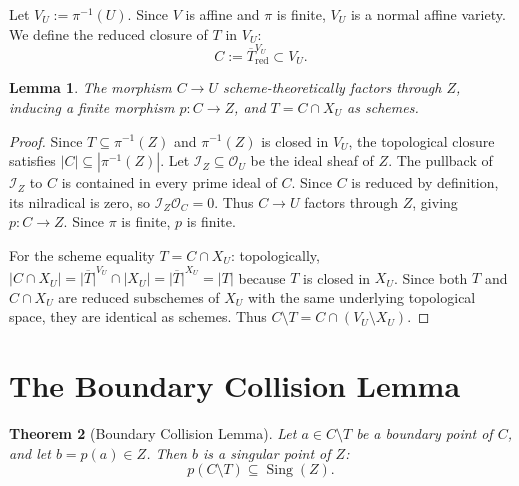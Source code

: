 \documentclass[11pt,reqno]{amsart}
\theoremstyle{plain}
\newtheorem{theorem}{Theorem}[section]
\newtheorem{lemma}[theorem]{Lemma}
\theoremstyle{definition}
\numberwithin{equation}{section}
\DeclareMathOperator{\Sing}{Sing}
\newcommand{\cO}{\mathcal{O}}
\begin{document}
Let $V_U := \pi^{-1}(U)$. Since $V$ is affine and $\pi$ is finite, $V_U$ is a normal affine variety.
We define the reduced closure of $T$ in $V_U$:
\begin{equation}\label{eq:closure-C}
C := \overline{T}^{V_U}_{\mathrm{red}} \subset V_U.
\end{equation}

\begin{lemma}\label{lem:closure-factorization}
The morphism $C \to U$ scheme-theoretically factors through $Z$, inducing a finite morphism $p: C \to Z$, and $T = C \cap X_U$ as schemes.
\end{lemma}
\begin{proof}
Since $T \subseteq \pi^{-1}(Z)$ and $\pi^{-1}(Z)$ is closed in $V_U$, the topological closure satisfies $|C| \subseteq |\pi^{-1}(Z)|$.
Let $\mathcal{I}_Z \subseteq \cO_U$ be the ideal sheaf of $Z$. The pullback of $\mathcal{I}_Z$ to $C$ is contained in every prime ideal of $C$. Since $C$ is reduced by definition, its nilradical is zero, so $\mathcal{I}_Z \cO_C = 0$. Thus $C \to U$ factors through $Z$, giving $p: C \to Z$. Since $\pi$ is finite, $p$ is finite.

For the scheme equality $T = C \cap X_U$: topologically, $|C \cap X_U| = \overline{|T|}^{V_U} \cap |X_U| = \overline{|T|}^{X_U} = |T|$ because $T$ is closed in $X_U$. Since both $T$ and $C \cap X_U$ are reduced subschemes of $X_U$ with the same underlying topological space, they are identical as schemes. Thus $C \setminus T = C \cap (V_U \setminus X_U)$.
\end{proof}

\section{The Boundary Collision Lemma}

\begin{theorem}[Boundary Collision Lemma]\label{thm:boundary-collision}
Let $a \in C \setminus T$ be a boundary point of $C$, and let $b = p(a) \in Z$. Then $b$ is a singular point of $Z$:
\[
p(C \setminus T) \subseteq \Sing(Z).
\]
\end{theorem}
\end{document}
